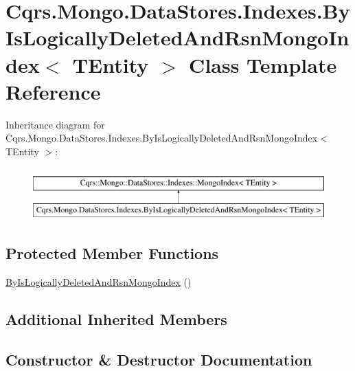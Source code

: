 \hypertarget{classCqrs_1_1Mongo_1_1DataStores_1_1Indexes_1_1ByIsLogicallyDeletedAndRsnMongoIndex}{}\section{Cqrs.\+Mongo.\+Data\+Stores.\+Indexes.\+By\+Is\+Logically\+Deleted\+And\+Rsn\+Mongo\+Index$<$ T\+Entity $>$ Class Template Reference}
\label{classCqrs_1_1Mongo_1_1DataStores_1_1Indexes_1_1ByIsLogicallyDeletedAndRsnMongoIndex}
Inheritance diagram for Cqrs.\+Mongo.\+Data\+Stores.\+Indexes.\+By\+Is\+Logically\+Deleted\+And\+Rsn\+Mongo\+Index$<$ T\+Entity $>$\+:\begin{figure}[H]
\begin{center}
\leavevmode
\includegraphics[height=2.000000cm]{classCqrs_1_1Mongo_1_1DataStores_1_1Indexes_1_1ByIsLogicallyDeletedAndRsnMongoIndex}
\end{center}
\end{figure}
\subsection*{Protected Member Functions}
\begin{DoxyCompactItemize}
\item 
\hyperlink{classCqrs_1_1Mongo_1_1DataStores_1_1Indexes_1_1ByIsLogicallyDeletedAndRsnMongoIndex_a41c3a6c01a59bba485893fab8518df09}{By\+Is\+Logically\+Deleted\+And\+Rsn\+Mongo\+Index} ()
\end{DoxyCompactItemize}
\subsection*{Additional Inherited Members}


\subsection{Constructor \& Destructor Documentation}
\mbox{\label{classCqrs_1_1Mongo_1_1DataStores_1_1Indexes_1_1ByIsLogicallyDeletedAndRsnMongoIndex_a41c3a6c01a59bba485893fab8518df09}} 
